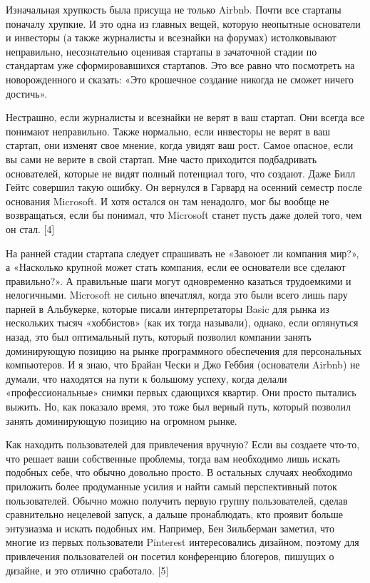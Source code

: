 \documentclass[ebook,12pt,oneside,openany]{memoir}
\begin{document}
Изначальная хрупкость была присуща не только Airbnb. Почти все
стартапы поначалу хрупкие. И это одна из главных вещей, которую
неопытные основатели и инвесторы (а также журналисты и всезнайки на
форумах) истолковывают неправильно, несознательно оценивая стартапы в
зачаточной стадии по стандартам уже сформировавшихся стартапов. Это
все равно что посмотреть на новорожденного и сказать: «Это крошечное
создание никогда не сможет ничего достичь». \newline

Нестрашно, если журналисты и всезнайки не верят в ваш стартап. Они
всегда все понимают неправильно. Также нормально, если инвесторы не
верят в ваш стартап, они изменят свое мнение, когда увидят ваш рост.
Самое опасное, если вы сами не верите в свой стартап. Мне часто
приходится подбадривать основателей, которые не видят полный потенциал
того, что создают. Даже Билл Гейтс совершил такую ошибку. Он вернулся
в Гарвард на осенний семестр после основания Microsoft. И хотя остался
он там ненадолго, мог бы вообще не возвращаться, если бы понимал, что
Microsoft станет пусть даже долей того, чем он стал. [4] \newline

На ранней стадии стартапа следует спрашивать не «Завоюет ли компания
мир?», а «Насколько крупной может стать компания, если ее основатели
все сделают правильно?». А правильные шаги могут одновременно казаться
трудоемкими и нелогичными. Microsoft не сильно впечатлял, когда это
были всего лишь пару парней в Альбукерке, которые писали
интерпретаторы Basic для рынка из нескольких тысяч «хоббистов» (как их
тогда называли), однако, если оглянуться назад, это был оптимальный
путь, который позволил компании занять доминирующую позицию на рынке
программного обеспечения для персональных компьютеров. И я знаю, что
Брайан Чески и Джо Геббия (основатели Airbnb) не думали, что находятся
на пути к большому успеху, когда делали «профессиональные» снимки
первых сдающихся квартир. Они просто пытались выжить. Но, как показало
время, это тоже был верный путь, который позволил занять доминирующую
позицию на огромном рынке. \newline

Как находить пользователей для привлечения вручную? Если вы создаете
что-то, что решает ваши собственные проблемы, тогда вам необходимо
лишь искать подобных себе, что обычно довольно просто. В остальных
случаях необходимо приложить более продуманные усилия и найти самый
перспективный поток пользователей. Обычно можно получить первую группу
пользователей, сделав сравнительно нецелевой запуск, а дальше
пронаблюдать, кто проявит больше энтузиазма и искать подобных им.
Например, Бен Зильберман заметил, что многие из первых пользователи
Pinterest интересовались дизайном, поэтому для привлечения
пользователей он посетил конференцию блогеров, пишущих о дизайне, и
это отлично сработало. [5] \newline
\end{document}

